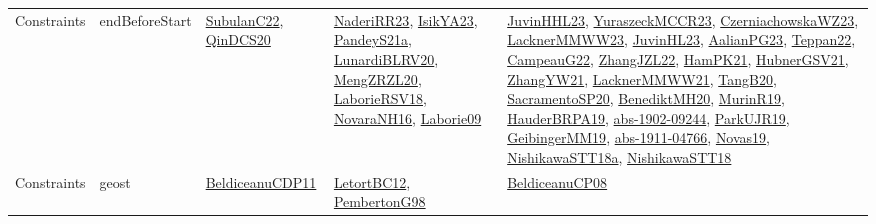 {\begin{longtable}{lp{3cm}>{\raggedright}p{6cm}>{\raggedright}p{6cm}p{8cm}}
Constraints & endBeforeStart & \href{articles/SubulanC22.pdf}{SubulanC22}\cite{SubulanC22}, \href{articles/QinDCS20.pdf}{QinDCS20}\cite{QinDCS20} & \href{articles/NaderiRR23.pdf}{NaderiRR23}\cite{NaderiRR23}, \href{articles/IsikYA23.pdf}{IsikYA23}\cite{IsikYA23}, \href{articles/PandeyS21a.pdf}{PandeyS21a}\cite{PandeyS21a}, \href{articles/LunardiBLRV20.pdf}{LunardiBLRV20}\cite{LunardiBLRV20}, \href{articles/MengZRZL20.pdf}{MengZRZL20}\cite{MengZRZL20}, \href{articles/LaborieRSV18.pdf}{LaborieRSV18}\cite{LaborieRSV18}, \href{articles/NovaraNH16.pdf}{NovaraNH16}\cite{NovaraNH16}, \href{papers/Laborie09.pdf}{Laborie09}\cite{Laborie09} & \href{papers/JuvinHHL23.pdf}{JuvinHHL23}\cite{JuvinHHL23}, \href{articles/YuraszeckMCCR23.pdf}{YuraszeckMCCR23}\cite{YuraszeckMCCR23}, \href{articles/CzerniachowskaWZ23.pdf}{CzerniachowskaWZ23}\cite{CzerniachowskaWZ23}, \href{articles/LacknerMMWW23.pdf}{LacknerMMWW23}\cite{LacknerMMWW23}, \href{papers/JuvinHL23.pdf}{JuvinHL23}\cite{JuvinHL23}, \href{papers/AalianPG23.pdf}{AalianPG23}\cite{AalianPG23}, \href{papers/Teppan22.pdf}{Teppan22}\cite{Teppan22}, \href{articles/CampeauG22.pdf}{CampeauG22}\cite{CampeauG22}, \href{papers/ZhangJZL22.pdf}{ZhangJZL22}\cite{ZhangJZL22}, \href{articles/HamPK21.pdf}{HamPK21}\cite{HamPK21}, \href{articles/HubnerGSV21.pdf}{HubnerGSV21}\cite{HubnerGSV21}, \href{articles/ZhangYW21.pdf}{ZhangYW21}\cite{ZhangYW21}, \href{papers/LacknerMMWW21.pdf}{LacknerMMWW21}\cite{LacknerMMWW21}, \href{papers/TangB20.pdf}{TangB20}\cite{TangB20}, \href{articles/SacramentoSP20.pdf}{SacramentoSP20}\cite{SacramentoSP20}, \href{articles/BenediktMH20.pdf}{BenediktMH20}\cite{BenediktMH20}, \href{papers/MurinR19.pdf}{MurinR19}\cite{MurinR19}, \href{articles/HauderBRPA19.pdf}{HauderBRPA19}\cite{HauderBRPA19}, \href{articles/abs-1902-09244.pdf}{abs-1902-09244}\cite{abs-1902-09244}, \href{papers/ParkUJR19.pdf}{ParkUJR19}\cite{ParkUJR19}, \href{papers/GeibingerMM19.pdf}{GeibingerMM19}\cite{GeibingerMM19}, \href{articles/abs-1911-04766.pdf}{abs-1911-04766}\cite{abs-1911-04766}, \href{articles/Novas19.pdf}{Novas19}\cite{Novas19}, \href{papers/NishikawaSTT18a.pdf}{NishikawaSTT18a}\cite{NishikawaSTT18a}, \href{papers/NishikawaSTT18.pdf}{NishikawaSTT18}\cite{NishikawaSTT18}\\
Constraints & geost & \href{articles/BeldiceanuCDP11.pdf}{BeldiceanuCDP11}\cite{BeldiceanuCDP11} & \href{papers/LetortBC12.pdf}{LetortBC12}\cite{LetortBC12}, \href{papers/PembertonG98.pdf}{PembertonG98}\cite{PembertonG98} & \href{papers/BeldiceanuCP08.pdf}{BeldiceanuCP08}\cite{BeldiceanuCP08}\\

\end{longtable}}

